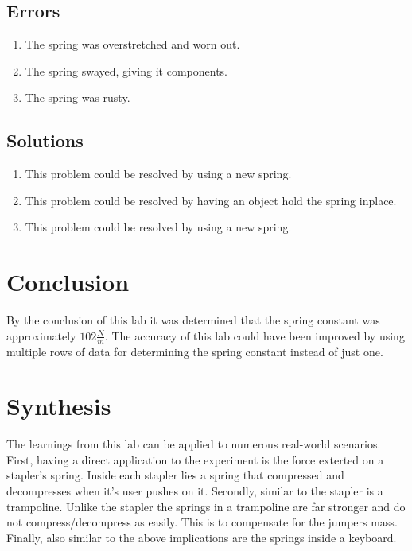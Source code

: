 \documentclass{article}
\begin{document}
\subsection*{Errors}
\begin{enumerate}
    \item {The spring was overstretched and worn out.}
    \item {The spring swayed, giving it components.}
    \item {The spring was rusty.}
\end{enumerate}
\subsection*{Solutions}
\begin{enumerate}
    \item {This problem could be resolved by using a new spring.}
    \item {This problem could be resolved by having an object hold the spring inplace.}
    \item {This problem could be resolved by using a new spring.}
\end{enumerate}\leavevmode

\section*{Conclusion}
By the conclusion of this lab it was determined that the spring constant was approximately $102\frac{N}{m}$.
The accuracy of this lab could have been improved by using multiple rows of data for determining the spring constant instead of just one.

\section*{Synthesis}
The learnings from this lab can be applied to numerous real-world scenarios.
First, having a direct application to the experiment is the force exterted on a stapler's spring. Inside each stapler lies a spring that compressed and decompresses when it's user pushes on it.
Secondly, similar to the stapler is a trampoline. Unlike the stapler the springs in a trampoline are far stronger and do not compress/decompress as easily. This is to compensate for the jumpers mass.
Finally, also similar to the above implications are the springs inside a keyboard.
\end{document}
